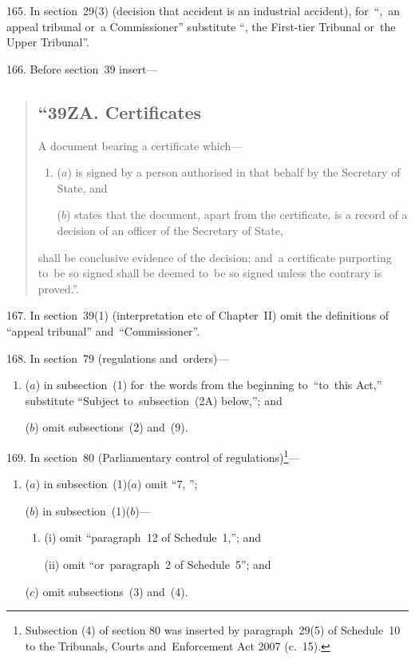 \documentclass[12pt,a4paper]{article}
\begin{document}
\medskip

165.  In section~29(3) (decision that accident is an industrial accident), for~“,~an appeal tribunal or~a Commissioner” substitute “, the First-tier Tribunal or~the Upper Tribunal”.

\medskip

166.  Before section~39 insert—
\begin{quotation}
\subsection*{“39ZA.  Certificates}

    A document bearing a certificate which—
\begin{enumerate}\item[]
    ($a$) 
    is signed by a person authorised in that behalf by the Secretary of State, and

    ($b$) 
    states that the document, apart from the certificate, is a record of a decision of an officer of the Secretary of State,
\end{enumerate}
    shall be conclusive evidence of the decision; and~a certificate purporting to~be so signed shall be deemed to~be so signed unless the contrary is proved.”. 
\end{quotation}

\medskip

167.  In section~39(1) (interpretation etc of Chapter~II) omit the definitions of “appeal tribunal” and~“Commissioner”.

\medskip

168.  In section~79 (regulations and~orders)—
\begin{enumerate}\item[]
($a$) in subsection~(1) for~the words from the beginning to~“to~this Act,” substitute “Subject to~subsection~(2A) below,”; and

($b$) omit subsections~(2) and~(9).
\end{enumerate}

\medskip

169.  In section~80 (Parliamentary control of regulations)\footnote{Subsection (4) of section 80 was inserted by paragraph~29(5) of Schedule~10 to the Tribunals, Courts and~Enforcement Act 2007 (c.~15).}—
\begin{enumerate}\item[]
($a$) in subsection~(1)($a$)  omit “7, ”;

($b$) in subsection~(1)($b$)—
\begin{enumerate}\item[]
(i) omit “paragraph~12 of Schedule~1,”; and

(ii) omit “or~paragraph~2 of Schedule~5”; and
\end{enumerate}

($c$) omit subsections~(3) and~(4).
\end{enumerate}
\end{document}
